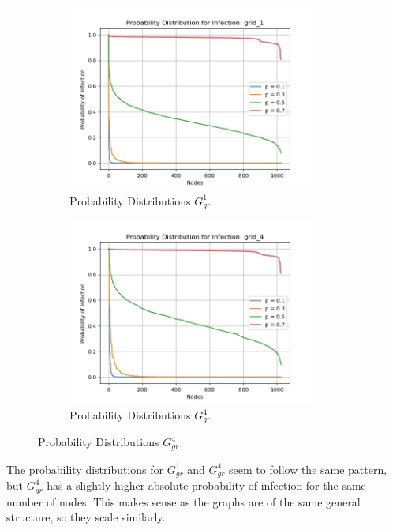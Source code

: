 \documentclass[letterpaper,11pt]{article}
\begin{document}
    \begin{figure}[htpb]
        \centering
    \begin{subfigure}{.5\textwidth}
        \centering
        \includegraphics[width=0.9\textwidth]{pdist_grid_1.jpg}
        \caption{Probability Distributions $G^{1}_{gr}$}
        \label{fig:pdist_grid_1-jpg}
    \end{subfigure}%
    \begin{subfigure}{.5\textwidth}
        \centering
        \includegraphics[width=0.9\textwidth]{pdist_grid_4.jpg}
        \caption{Probability Distributions $G^{4}_{gr}$}
        \label{fig:pdist_grid_1-jpg}
    \end{subfigure}
    \end{figure}

    The probability distributions for $G^{1}_{gr}$ and $G^{4}_{gr}$ seem to 
    follow the same pattern, but $G^{4}_{gr}$ has a slightly higher absolute
    probability of infection for the same number of nodes. This makes sense as
    the graphs are of the same general structure, so they scale similarly.
\end{document}
